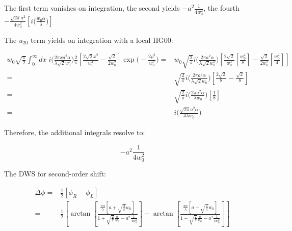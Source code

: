 \documentclass[aps,twoside,secnumarabic,balancelastpage,amsmath,amssymb,nofootinbib,hyperref=pdftex]{revtex4}
\newcommand{\bigfrac}[2]{\Big( \frac{#1}{#2}\Big)}
\begin{document}
The first term vanishes on integration, the second yields $-a^2 \frac{1}{4 w_0^2}$, the fourth $-\frac{\sqrt{2 \pi} a^2}{4w_0^2}
		[i  \bigfrac{ w_{0} \alpha}{\lambda}
		 ]$

The $u_{20}$ term yields on integration with a local HG00:

\begin{align*}
w_0 \sqrt{ \frac{\pi}{2} }   \int_{0}^{\infty} dx \;
            			i  
				\big( \frac{2 \pi x a^2 \alpha}{ \lambda \sqrt{2} w_0^2} \big)
                \frac{2}{\pi}
                \left[
                    \frac{2 \sqrt{2} x^2}{w_0^4}
                    -
                    \frac{\sqrt{2}}{2 w_0^2}
                \right]
                \exp \big( - \frac{2 \rho^2}{w_0^2} \big)
                =&
    w_0 \sqrt{ \frac{2}{\pi} } 
            			i  
				\big( \frac{2 \pi  a^2 \alpha}{ \lambda \sqrt{2} w_0^2} \big)
                \left[
                    \frac{2 \sqrt{2}}{w_0^4}
                    [\frac{w_0^4}{8}]
                    -
                    \frac{\sqrt{2}}{2 w_0^2}                 
                    [\frac{w_0^2}{4}]
                \right]
                               \\ =&
     \sqrt{ \frac{2}{\pi} } 
            			i  
				\big( \frac{2 \pi  a^2 \alpha}{ \lambda \sqrt{2} w_0} \big)
                \left[
                    \frac{2 \sqrt{2}}{8}
                    -
                    \frac{\sqrt{2}}{8}
                \right]
                                               \\ =&
     \sqrt{ \frac{2}{\pi} } 
            			i  
				\big( \frac{2 \pi  a^2 \alpha}{ \lambda  w_0} \big)
                \left[
                    \frac{1}{8}
                \right]
                                                               \\ =&
            			i  
				\big( \frac{\sqrt{2 \pi}  a^2 \alpha}{ 4\lambda  w_0} \big)
\end{align*}

Therefore, the additional integrals resolve to:

\begin{equation*}
				-
				a^2 \frac{1}{4 w_0^2}
\end{equation*}

The DWS for second-order shift:

\begin{align*}
	\Delta \phi = &
		 \frac{1}{2} 
		 \left[
		 	\phi_R - \phi_L
		 \right]
		 \\ = &
		 \frac{1}{2}
		 \left[
							\arctan
				\left[
					\frac
					{ \frac{\pi \alpha}{\lambda}
					\left[
						a 
						+
						\sqrt{\frac{2}{\pi}} w_0
					\right]			
					}					
				{1
				+
				 \sqrt{\frac{2}{\pi}} \frac{a}{w_0}
				 		-
				a^2 \frac{1}{4 w_0^2}
				 }
				\right]
		-
						\arctan
				\left[
					\frac
					{ \frac{\pi \alpha}{\lambda}
					\left[
						a 
						-
						\sqrt{\frac{2}{\pi}} w_0
					\right]				
					}					
				{1
				-
				 \sqrt{\frac{2}{\pi}} \frac{a}{w_0}
				 		-
				a^2 \frac{1}{4 w_0^2}
				 }
				\right]
			\right]							 	
\end{align*}
\end{document}
